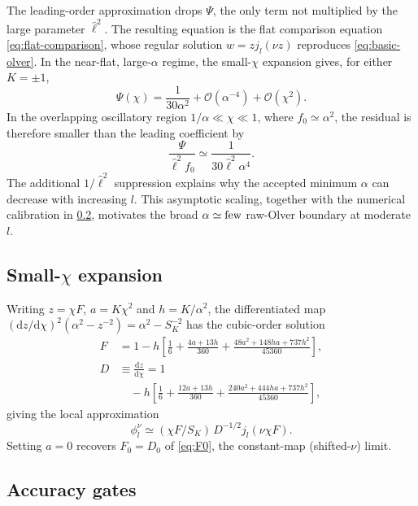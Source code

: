 \documentclass[prd, twocolumn, superscriptaddress, tightenlines, longbibliography, nofootinbib, eqsecnum, amsfonts, amsmath, floatfix, notitlepage]{revtex4-2}
\newcommand{\dd}{\mathrm{d}}
\newcommand{\SK}{S_K}
\newcommand{\jl}{j_l}
\newcommand{\order}{\mathcal{O}}
\begin{document}
The leading-order approximation drops $\Psi$, the only term not multiplied by
the large parameter $\hat\ell^2$. The resulting equation is the flat comparison
equation \cref{eq:flat-comparison}, whose regular solution
$w=z\jl(\nu z)$ reproduces \cref{eq:basic-olver}. In the near-flat,
large-$\alpha$ regime, the small-$\chi$ expansion gives, for either
$K=\pm1$,
\begin{equation}
  \Psi(\chi)=\frac{1}{30\alpha^2}
  +\order(\alpha^{-4})+\order(\chi^2).
\end{equation}
In the overlapping oscillatory region $1/\alpha\ll\chi\ll1$, where
$f_0\simeq\alpha^2$, the residual is therefore smaller than the leading
coefficient by
\begin{equation}
  \frac{\Psi}{\hat\ell^2 f_0}
  \simeq\frac{1}{30\hat\ell^2\alpha^4}.
\end{equation}
The additional $1/\hat\ell^2$ suppression explains why the accepted minimum
$\alpha$ can decrease with increasing $l$. This asymptotic scaling, together
with the numerical calibration in \cref{app:bessel-gates}, motivates the broad
$\alpha\simeq{\rm few}$ raw-Olver boundary at moderate $l$.

\subsection{Small-\texorpdfstring{$\chi$}{chi} expansion}
\label{app:bessel-smallchi}

Writing $z=\chi F$, $a=K\chi^2$ and $h=K/\alpha^2$, the differentiated map
$(\dd z/\dd\chi)^2(\alpha^2-z^{-2})=\alpha^2-\SK^{-2}$ has the cubic-order solution
\begin{align}
  F&=1-h\left[\frac16+\frac{4a+13h}{360}+\frac{48a^2+148ha+737h^2}{45360}\right],
  \label{eq:F-smallchi}\\
  D&\equiv\frac{\dd z}{\dd\chi}=1 \nonumber\\
  &\quad -h\left[\frac16+\frac{12a+13h}{360}+\frac{240a^2+444ha+737h^2}{45360}\right],
  \label{eq:D-smallchi}
\end{align}
giving the local approximation
\begin{equation}
\phi_l^\nu\simeq (\chi F/\SK)\,D^{-1/2}\jl(\nu\chi F).
\end{equation}
Setting $a=0$ recovers
$F_0=D_0$ of \cref{eq:F0}, the constant-map (shifted-$\nu$) limit.

\subsection{Accuracy gates}
\label{app:bessel-gates}
\end{document}
